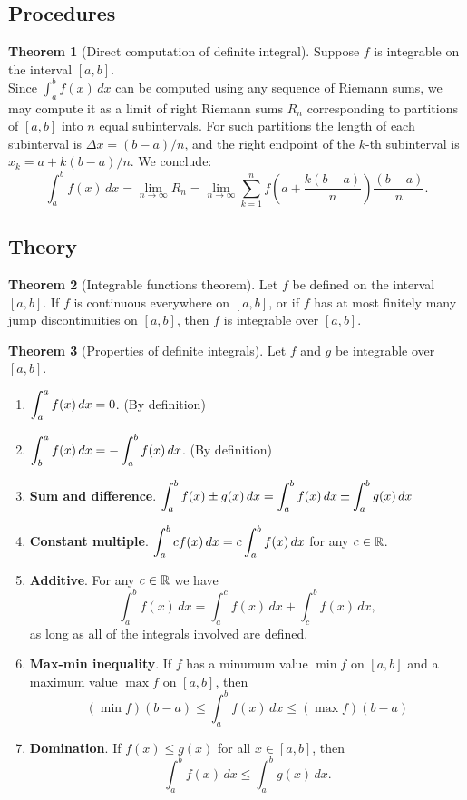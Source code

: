 \documentclass[11pt]{article}
\theoremstyle{definition}
\theoremstyle{named}
\newtheorem*{namedtheorem}{Theorem}
\numberwithin{myalgctr}{section}
\begin{document}

\subsection*{Procedures}
\begin{namedtheorem}[Direct computation of definite integral] Suppose $f$ is integrable on the interval $[a,b]$. \\
  Since $\displaystyle\int_a^bf(x)\, dx$ can be computed using any sequence of Riemann sums, we may compute it as a limit of right Riemann sums $R_n$ corresponding to partitions of $[a,b]$ into $n$ equal subintervals. For such partitions the length of each subinterval is $\Delta x=(b-a)/n$, and the right endpoint of the $k$-th subinterval is $x_k=a+k(b-a)/n$. We conclude:
  \[
  \int_a^b f(x)\, dx=\lim_{n\to\infty} R_n=\lim_{n\to\infty}\sum_{k=1}^n f\left(a+\frac{k(b-a)}{n}\right)\frac{(b-a)}{n}.
  \]

\end{namedtheorem}

 \subsection*{Theory}
\begin{namedtheorem}[Integrable functions theorem] Let $f$ be defined on the interval $[a,b]$.
If $f$ is continuous everywhere on $[a,b]$, or if $f$ has at most finitely many jump discontinuities on $[a,b]$, then $f$ is integrable over $[a,b]$.
\end{namedtheorem}

\begin{namedtheorem}[Properties of definite integrals]
  Let $f$ and $g$ be integrable over $[a,b]$.
  \begin{enumerate}
    \item $\displaystyle\int_a^a f(x)\, dx=0$. (By definition)
    \item $\displaystyle\int_b^af(x)\, dx=-\int_a^b f(x)\, dx$. (By definition)
    \item {\bf Sum and difference}. $\displaystyle\int_a^b f(x)\pm g(x)\, dx=\int_a^bf(x)\, dx\pm \int_a^bg(x)\, dx$
    \item {\bf Constant multiple}. $\displaystyle\int_a^bcf(x)\, dx=c\int_a^bf(x)\, dx$ for any $c\in {\mathbb R}$.
    \item {\bf Additive}. For any $c\in {\mathbb R}$ we have
    \[
    \int_a^bf(x)\, dx=\int_a^cf(x)\, dx+\int_c^b f(x)\, dx,
    \]
    as long as all of the integrals involved are defined.
    \item {\bf Max-min inequality}. If $f$ has a minumum value $\min f$ on $[a,b]$ and a maximum value $\max f$ on $[a,b]$, then
    \[
    (\min f)(b-a)\leq \int_a^b f(x)\, dx\leq (\max f)(b-a)
    \]
    \item {\bf Domination}. If $f(x)\leq g(x)$ for all $x\in [a,b]$, then
    \[
    \int_a^bf(x)\, dx\leq \int_a^bg(x)\, dx.
    \]

  \end{enumerate}

\end{namedtheorem}
\end{document}

